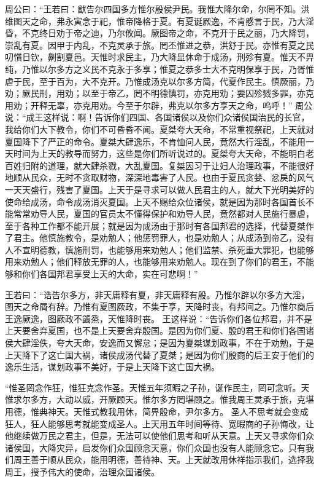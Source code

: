 \documentclass[a4paper,12pt,UTF8,twoside]{ctexbook}
\begin{document}
周公曰：“王若曰：猷告尔四国多方惟尔殷侯尹民。我惟大降尔命，尔罔不知。洪维图天之命，弗永寅念于祀，惟帝降格于夏。有夏诞厥逸，不肯慼言于民，乃大淫昏，不克终日劝于帝之迪，乃尔攸闻。厥图帝之命，不克开于民之丽，乃大降罚，崇乱有夏。因甲于内乱，不克灵承于旅。罔丕惟进之恭，洪舒于民。亦惟有夏之民叨懫日钦，劓割夏邑。天惟时求民主，乃大降显休命于成汤，刑殄有夏。惟天不畀纯，乃惟以尔多方之义民不克永于多享；惟夏之恭多士大不克明保享于民，乃胥惟虐于民，至于百为，大不克开。乃惟成汤克以尔多方简，代夏作民主。慎厥丽，乃劝；厥民刑，用劝；以至于帝乙，罔不明德慎罚，亦克用劝；要囚殄戮多罪，亦克用劝；开释无辜，亦克用劝。今至于尔辟，弗克以尔多方享天之命，呜呼！”
周公说：“成王这样说：啊！告诉你们四国、各国诸侯以及你们众诸侯国治民的长官，我给你们大下教令，你们不可昏昏不闻。夏桀夸大天命，不常重视祭祀，上天就对夏国降下了严正的命令。夏桀大肆逸乐，不肯恤问人民，竟然大行淫乱，不能用一天时间为上天的教导而努力，这些是你们所听说过的。夏桀夸大天命，不能明白老百姓归附的道理，就大肆杀戮，大乱夏国。复桀因习于让妇人治理政事，不能很好地顺从民众，无时不贪取财物，深深地毒害了人民。也由于夏民贪婪、忿戾的风气一天天盛行，残害了夏国。上天于是寻求可以做人民君主的人，就大下光明美好的使命给成汤，命令成汤消灭夏国。上天不赐给众位诸侯，就是因为那时各国首长不能常常劝导人民，夏国的官员太不懂得保护和劝导人民，竟然都对人民施行暴虐，至于各种工作都不能开展；就是因为成汤由于那时有各国邦君的选择，代替夏桀作了君主。他慎施教令，是劝勉人；他惩罚罪人，也是劝勉人；从成汤到帝乙，没有人不宣明德教，慎施刑罚，也能够用来劝勉人；他们监禁、杀死重大罪犯，也能够用来劝勉人；他们释放无罪的人，也能够用来劝勉人。现在到了你们的君王，不能够和你们各国邦君享受上天的大命，实在可悲啊！”

王若曰：“诰告尔多方，非天庸释有夏，非天庸释有殷。乃惟尔辟以尔多方大淫，图天之命屑有辞。乃惟有夏图厥政，不集于享，天降时丧，有邦间之。乃惟尔商后王逸厥逸，图厥政不蠲烝，天惟降时丧。
王这样说：“告诉你们各位邦君，并不是上天要舍弃夏国，也不是上天要舍弃殷国。是因为你们夏、殷的君王和你们各国诸侯大肆淫佚，夸大天命，安逸而又懈怠；是因为夏桀谋划政事，不在于劝勉，于是上天降下了这亡国大祸，诸侯成汤代替了夏桀；是因为你们殷商的后王安于他们的逸乐生活，谋划政事不美好，于是上天降下这亡国大祸。

“惟圣罔念作狂，惟狂克念作圣。天惟五年须暇之子孙，诞作民主，罔可念听。天惟求尔多方，大动以威，开厥顾天。惟尔多方罔堪顾之。惟我周王灵承于旅，克堪用德，惟典神天。天惟式教我用休，简畀殷命，尹尔多方。
圣人不思考就会变成狂人，狂人能够思考就能变成圣人。上天用五年时间等待、宽暇商的子孙悔改，让他继续做万民之君主，但是，无法可以使他们思考和听从天意。上天又寻求你们众诸侯国，大降灾异，启发你们众国顾念天意，你们众国也没有人能顾念它。只有我们周王善于顺从民众，能用明德，善待神、天。上天就改用休祥指示我们，选择我周王，授予伟大的使命，治理众国诸侯。
\end{document}
